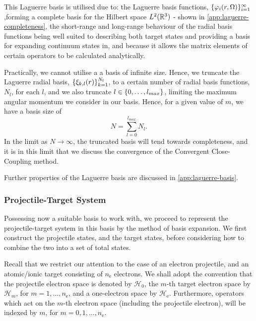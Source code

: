 \documentclass[draft]{article}
\begin{document}
This Laguerre basis is utilised due to: the Laguerre basis functions,
$\lbrace\varphi_{i}(r, \Omega)\rbrace_{i = 1}^{\infty}$,forming a complete basis
for the Hilbert space $L^{2}(\mathbb{R}^{3})$ - shown in
\autoref{app:laguerre-completeness}, the short-range and long-range behaviour of
the radial basis functions being well suited to describing both target states
and providing a basis for expanding continuum states in, and because it allows
the matrix elements of certain operators to be calculated analytically.

Practically, we cannot utilise a a basis of infinite size.
Hence, we truncate the Laguerre radial basis,
$\lbrace\xi_{k, l}(r)\rbrace_{k = 1}^{N_{l}}$, to a certain number of radial basis
functions, $N_{l}$, for each $l$, and we also truncate
$l \in \lbrace0, \dotsc, l_{max}\rbrace$,
limiting the maximum angular momentum we consider in our basis.
Hence, for a given value of $m$, we have a basis size of
\begin{equation}
  \label{eq:basis-size}
  N
  =
  \sum_{l = 0}^{l_{max}}
  N_{l}
  .
\end{equation}
In the limit as $N \to \infty$, the truncated basis will tend towards
completeness, and it is in this limit that we discuss the convergence of the
Convergent Close-Coupling method.

Further properties of the Laguerre basis are discussed in
\autoref{app:laguerre-basis}.

\subsubsection{Projectile-Target System}
\label{sec:projectile-target}

Possessing now a suitable basis to work with, we proceed to represent the
projectile-target system in this basis by the method of basis expansion.
We first construct the projectile states, and the target states, before
considering how to combine the two into a set of total states.

Recall that we restrict our attention to the case of an electron projectile, and
an atomic/ionic target consisting of $n_{\mathrm{e}}$ electrons.
We shall adopt the convention that the projectile electron space is denoted by
$\mathcal{H}_{0}$, the $m$-th target electron space by $\mathcal{H}_{m}$, for
$m = 1, \dotsc, n_{\mathrm{e}}$, and a one-electron space by
$\mathcal{H}_{\mathrm{e}}$.
Furthermore, operators which act on the $m$-th electron space (including the
projectile electron), will be indexed by $m$, for
$m = 0, 1, \dotsc, n_{\mathrm{e}}$.
\end{document}
